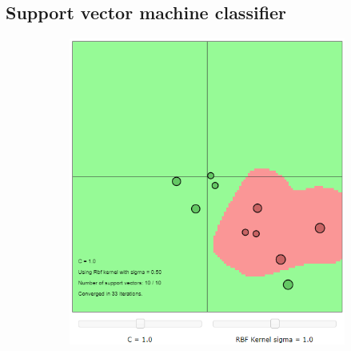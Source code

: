\documentclass{article}
\begin{document}
    \subsection{Support vector machine classifier}
        \begin{figure}[h]
             \centering
             \hspace{0.15\textwidth}
             \begin{subfigure}[b]{0.3\textwidth}
                 \centering
                 \includegraphics[width=\textwidth]{Assignment 1/figures/RBF_few_datapoints.png}
                 \label{fig:few_datapoints}
             \end{subfigure}
             \hfill
             \begin{subfigure}[b]{0.3\textwidth}
                 \centering

\end{subfigure}
\end{figure}
\end{document}
